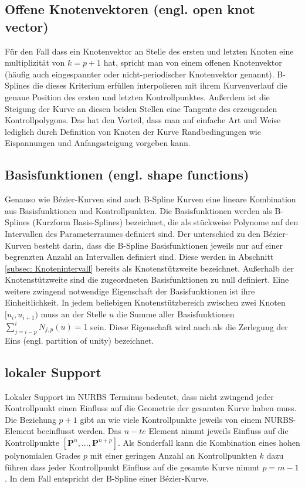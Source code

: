 \documentclass[german,a4paper,12pt,oneside]{scrbook}
\theoremstyle{definition}
\theoremstyle{definition}
\theoremstyle{definition}
\theoremstyle{definition}
\theoremstyle{definition}
\theoremstyle{definition}
\begin{document}
\subsection{Offene Knotenvektoren (engl. open knot vector)}
Für den Fall dass ein Knotenvektor an Stelle des ersten und letzten Knoten eine multiplizität von $k = p+1$ hat, spricht man von einem offenen Knotenvektor (häufig auch eingespannter oder nicht-periodischer Knotenvektor genannt). B-Splines die dieses Kriterium erfüllen interpolieren mit ihrem Kurvenverlauf die genaue Position des ersten und letzten Kontrollpunktes. Außerdem ist die Steigung der Kurve an diesen beiden Stellen eine Tangente des erzeugenden Kontrollpolygons. Das hat den Vorteil, dass man auf einfache Art und Weise lediglich durch Definition von Knoten der Kurve Randbedingungen wie Eispannungen und Anfangssteigung vorgeben kann.

\subsection{Basisfunktionen (engl. shape functions)}
Genauso wie Bézier-Kurven sind auch B-Spline Kurven eine lineare Kombination aus Basisfunktionen und Kontrollpunkten. Die Basisfunktionen werden als B-Splines (Kurzform Basis-Splines) bezeichnet, die als stückweise Polynome auf den Intervallen des Parameterraumes definiert sind. Der unterschied zu den Bézier-Kurven besteht darin, dass die B-Spline Basisfunktionen jeweils nur auf einer begrenzten Anzahl an Intervallen definiert sind. Diese werden in Abschnitt \ref{subsec: Knotenintervall} bereits als Knotenstützweite bezeichnet. Außerhalb der Knotenstützweite sind die zugeordneten Basisfunktionen zu null definiert. 
Eine weitere zwingend notwendige Eigenschaft der Basisfunktionen ist ihre Einheitlichkeit. In jedem beliebigen Knotenstützbereich zwischen zwei Knoten $[u_i, u_{i+1})$ muss an der Stelle $u$ die Summe aller Basisfunktionen $\sum^{i}_{j=i-p} {N_{j,p}(u)} = 1$ sein. Diese Eigenschaft wird auch als die Zerlegung der Eins (engl. partition of unity) bezeichnet. 


\subsection{lokaler Support}
Lokaler Support im NURBS Terminus bedeutet, dass nicht zwingend jeder Kontrollpunkt einen Einfluss auf die Geometrie der gesamten Kurve haben muss. Die Beziehung $p+1$ gibt an wie viele Kontrollpunkte jeweils von einem NURBS-Element beeinflusst werden. Das $n-te$ Element nimmt jeweils Einfluss auf die Kontrollpunkte $[\bm{P}^{n},...,\bm{P}^{n+p}]$. Als Sonderfall kann die Kombination eines hohen polynomialen Grades $p$ mit einer geringen Anzahl an Kontrollpunkten $k$ dazu führen dass jeder Kontrollpunkt Einfluss auf die gesamte Kurve nimmt $p = m-1$. In dem Fall entspricht der B-Spline einer Bézier-Kurve.
\end{document}
